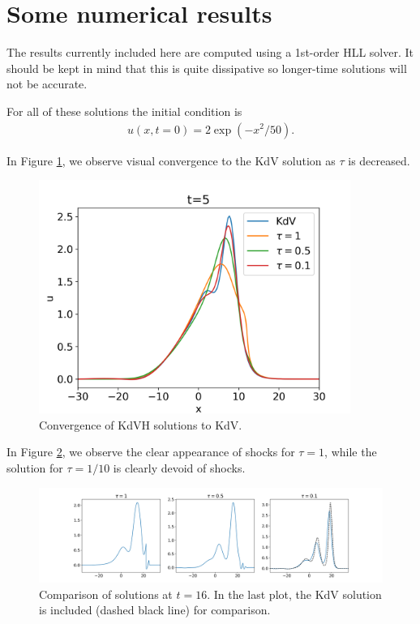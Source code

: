 \documentclass{article}
\theoremstyle{plain}
\theoremstyle{definition}
\numberwithin{theorem}{section}
\newcommand{\todo}[1]{{\Large{\color{red}{#1}}}}
\begin{document}
\todo{TODO: Can we reverse-engineer relative energy convergence results to show well-posedness of KdV using this?}


\section{Some numerical results}

The results currently included here are computed using a 1st-order HLL solver.  It should be
kept in mind that this is quite dissipative so longer-time solutions will not be accurate.

For all of these solutions the initial condition is
\begin{align}
    u(x,t=0) = 2 \exp(-x^2/50).
\end{align}

In Figure \ref{fig:convergence}, we observe visual convergence to the KdV solution as
$\tau$ is decreased.

\begin{figure}
\centering
    \includegraphics[width=4in]{figures/Convergence.png}
    \caption{Convergence of KdVH solutions to KdV.\label{fig:convergence}}
\end{figure}

In Figure \ref{fig:shocks}, we observe the clear appearance of shocks for $\tau=1$, while
the solution for $\tau=1/10$ is clearly devoid of shocks.

\begin{figure}
\centering
    \includegraphics[width=6in]{figures/KdVH_solutions.png}
    \caption{Comparison of solutions at $t=16$.  In the last plot, the KdV solution is included (dashed black line)
    for comparison.\label{fig:shocks}}
\end{figure}
\end{document}
